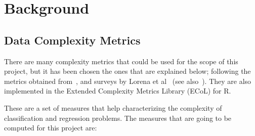 %
%
%
% 
%
%
%
%

\chapter{Background}\label{chp:background}

\section{Data Complexity Metrics}\label{sec:ecol}

There are many complexity metrics that could be used for the scope of this 
project, but it has been chosen the ones that are explained below; following 
the metrics obtained from~\cite{HoB2002}, and surveys by Lorena et 
al~\cite{lorena2018,Lorena2019} (see also~\cite{BasuH2006}). They are also 
implemented in the Extended Complexity Metrics Library (ECoL) for R.

These are a set of measures that help characterizing the complexity of 
classification and regression problems. The measures that are going to be 
computed for this project are:


